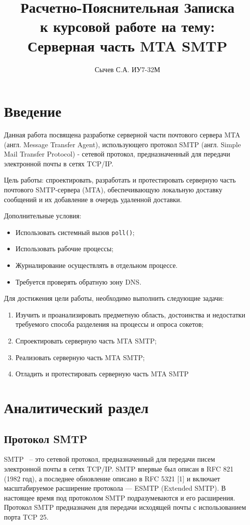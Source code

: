 \documentclass[a4paper,12pt]{report}
\title{Расчетно-Пояснительная Записка \\
    \large к курсовой работе на тему: \\ Серверная часть MTA SMTP}
\author{Сычев С.А. ИУ7-32М}
\begin{document}
\maketitle

\tableofcontents

\newpage
\chapter*{Введение}

Данная работа посвящена разработке серверной части почтового сервера MTA (англ. Message Transfer Agent), использующего протокол SMTP (англ. Simple Mail Transfer Protocol) - сетевой протокол, предназначенный для передачи электронной почты в сетях TCP/IP. 

Цель работы: спроектировать, разработать и протестировать серверную часть почтового SMTP-сервера (MTA), обеспечивающую локальную доставку сообщений и их добавление в очередь удаленной доставки. 

Дополнительные условия:
\begin{itemize}
\item Использовать системный вызов \texttt{poll()};
\item Использовать рабочие процессы;
\item Журналирование осуществлять в отдельном процессе.
\item Требуется проверять обратную зону DNS.
\end{itemize}

Для достижения цели работы, необходимо выполнить следующие задачи:
\begin{enumerate}
    \item Изучить и проанализировать предметную область, достоинства и недостатки требуемого способа разделения на процессы и опроса сокетов;
    \item Спроектировать серверную часть MTA SMTP;
    \item Реализовать серверную часть MTA SMTP; 
    \item Отладить и протестировать серверную часть MTA SMTP
\end{enumerate}

\newpage
\chapter{Аналитический раздел}

\section{Протокол SMTP}
SMTP ~-- это сетевой протокол, предназначенный для передачи писем электронной почты в сетях TCP/IP. SMTP впервые был описан в RFC 821 (1982 год), а последнее обновление описано в RFC 5321 [1] и включает масштабируемое расширение протокола — ESMTP (Extended SMTP). В настоящее время под протоколом SMTP подразумеваются и его расширения. Протокол SMTP предназначен для передачи исходящей почты с использованием порта TCP 25.
\end{document}
